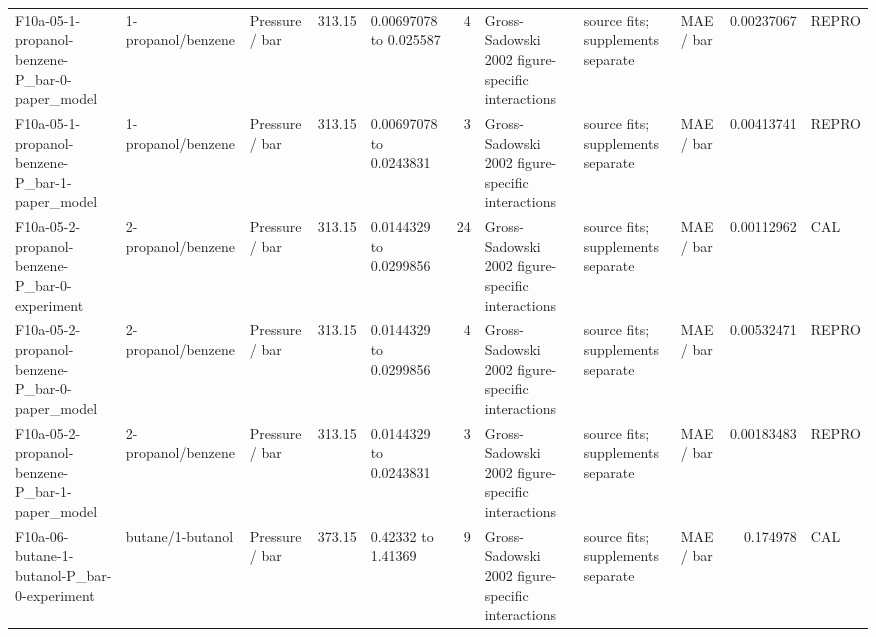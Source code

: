\begin{landscape}
\begin{longtable}{L{1.9cm}L{2.5cm}L{2.1cm}L{1.6cm}L{1.6cm}rL{2.4cm}L{1.9cm}L{2.2cm}rL{1cm}}
F10a-\allowbreak{}05-\allowbreak{}1-\allowbreak{}propanol-\allowbreak{}benzene-\allowbreak{}P\_\allowbreak{}bar-\allowbreak{}0-\allowbreak{}paper\_\allowbreak{}model & 1-\allowbreak{}propanol/\allowbreak{}benzene & Pressure /\allowbreak{} bar & 313.15 & 0.00697078 to 0.025587 & 4 & Gross-\allowbreak{}Sadowski 2002 figure-\allowbreak{}specific interactions & source fits; supplements separate & MAE /\allowbreak{} bar & 0.00237067 & REPRO \\
F10a-\allowbreak{}05-\allowbreak{}1-\allowbreak{}propanol-\allowbreak{}benzene-\allowbreak{}P\_\allowbreak{}bar-\allowbreak{}1-\allowbreak{}paper\_\allowbreak{}model & 1-\allowbreak{}propanol/\allowbreak{}benzene & Pressure /\allowbreak{} bar & 313.15 & 0.00697078 to 0.0243831 & 3 & Gross-\allowbreak{}Sadowski 2002 figure-\allowbreak{}specific interactions & source fits; supplements separate & MAE /\allowbreak{} bar & 0.00413741 & REPRO \\
F10a-\allowbreak{}05-\allowbreak{}2-\allowbreak{}propanol-\allowbreak{}benzene-\allowbreak{}P\_\allowbreak{}bar-\allowbreak{}0-\allowbreak{}experiment & 2-\allowbreak{}propanol/\allowbreak{}benzene & Pressure /\allowbreak{} bar & 313.15 & 0.0144329 to 0.0299856 & 24 & Gross-\allowbreak{}Sadowski 2002 figure-\allowbreak{}specific interactions & source fits; supplements separate & MAE /\allowbreak{} bar & 0.00112962 & CAL \\
F10a-\allowbreak{}05-\allowbreak{}2-\allowbreak{}propanol-\allowbreak{}benzene-\allowbreak{}P\_\allowbreak{}bar-\allowbreak{}0-\allowbreak{}paper\_\allowbreak{}model & 2-\allowbreak{}propanol/\allowbreak{}benzene & Pressure /\allowbreak{} bar & 313.15 & 0.0144329 to 0.0299856 & 4 & Gross-\allowbreak{}Sadowski 2002 figure-\allowbreak{}specific interactions & source fits; supplements separate & MAE /\allowbreak{} bar & 0.00532471 & REPRO \\
F10a-\allowbreak{}05-\allowbreak{}2-\allowbreak{}propanol-\allowbreak{}benzene-\allowbreak{}P\_\allowbreak{}bar-\allowbreak{}1-\allowbreak{}paper\_\allowbreak{}model & 2-\allowbreak{}propanol/\allowbreak{}benzene & Pressure /\allowbreak{} bar & 313.15 & 0.0144329 to 0.0243831 & 3 & Gross-\allowbreak{}Sadowski 2002 figure-\allowbreak{}specific interactions & source fits; supplements separate & MAE /\allowbreak{} bar & 0.00183483 & REPRO \\
F10a-\allowbreak{}06-\allowbreak{}butane-\allowbreak{}1-\allowbreak{}butanol-\allowbreak{}P\_\allowbreak{}bar-\allowbreak{}0-\allowbreak{}experiment & butane/\allowbreak{}1-\allowbreak{}butanol & Pressure /\allowbreak{} bar & 373.15 & 0.42332 to 1.41369 & 9 & Gross-\allowbreak{}Sadowski 2002 figure-\allowbreak{}specific interactions & source fits; supplements separate & MAE /\allowbreak{} bar & 0.174978 & CAL \\

\end{longtable}
\end{landscape}
